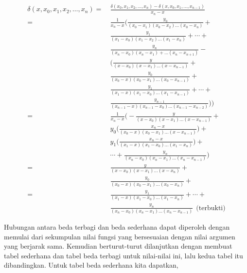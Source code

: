 \begin{equation*}
\begin{split}
\delta(x,x_0,x_1,x_2,\ldots,x_n) =~& \frac{\delta(x_0,x_1,x_2,\ldots,x_n)-\delta(x,x_0,x_1,\dots,x_{n-1})}{x_n - x}\\[1ex]
=~& \frac{1}{x_n-x}  \Bigg( \frac{y_0}{(x_0-x_1)(x_0-x_2)\ldots(x_0-x_n)}+\\[1ex]
& \frac{y_1}{(x_1-x_0)(x_1-x_2)\ldots(x_1-x_n)}+\cdots+\\[1ex]
& \frac{y_n}{(x_n-x_0)(x_n-x_1)+\ldots(x_n-x_{n+1})}-\\[1ex]
& \bigg(\frac{y}{(x-x_0)(x-x_1)\ldots(x-x_{n-1})}+\\[1ex]
& \frac{y_0}{(x_0-x)(x_0-x_1)\ldots(x_0-x_{n-1})}+\\[1ex]
& \frac{y_1}{(x_1-x)(x_1-x_0)\ldots(x_1-x_{n-1})}+\cdots+\\[1ex]
& \frac{y_{n-1}}{(x_{n-1}-x)(x_{n-1}-x_0)\ldots(x_{n-1}-x_{n-2})}\bigg)\Bigg)\\[1ex]
=~&\frac{1}{x_n-x} \Bigg( -\frac{y}{(x-x_0)(x-x_1)\ldots(x-x_{n-1})}+\\[1ex]
& y_0\bigg(\frac{x_n-x}{(x_0-x)(x_0-x_1)\ldots(x-x_{n-1})}\bigg)+\\[1ex]
& y_1\bigg(\frac{x_n-x}{(x_1-x)(x_1-x_0)\ldots(x_1-x_n)}\bigg)+\\[1ex]
& \cdots + \frac{y_n}{(x_n-x_0)(x_n-x_1)\ldots(x_n-x_{n-1})}\Bigg)\\[1ex]
=~& \frac{y}{(x-x_0)(x-x_1)\ldots(x-x_n)} +\\[1ex]
& \frac{y_0}{(x_0-x)(x_0-x_1)\ldots(x_0-x_n)} + \\[1ex]
=~& \frac{y_1}{(x_1-x)(x_1-x_0)\ldots(x_1-x_n)} + \cdots + \\[1ex]
&\frac{y_n}{(x_n-x_0)(x_n-x_1)\ldots(x_n-x_{n-1})} ~~\text{(terbukti)}
\end{split}
\end{equation*}

Hubungan antara beda terbagi dan beda sederhana dapat diperoleh dengan memulai dari sekumpulan nilai fungsi yang bersesuaian dengan nilai argumen yang berjarak sama. Kemudian berturut-turut dilanjutkan dengan membuat tabel sederhana dan tabel beda terbagi untuk nilai-nilai ini, lalu kedua tabel itu dibandingkan. Untuk tabel beda sederhana kita dapatkan,


